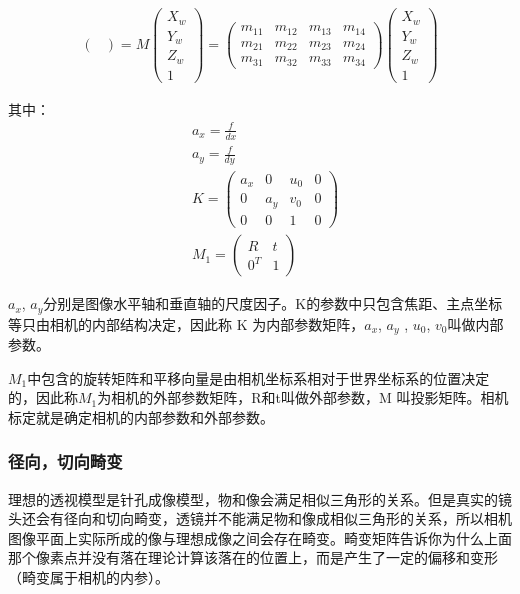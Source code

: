 \begin{align}
\begin{pmatrix}
\end{pmatrix} = M\begin{pmatrix}
X_w \\ Y_w \\ Z_w \\ 1\end{pmatrix}
= \begin{pmatrix}
m_{11} & m_{12} & m_{13} & m_{14}\\
m_{21} & m_{22} & m_{23} & m_{24}\\
m_{31} & m_{32} & m_{33} & m_{34}
\end{pmatrix}
\begin{pmatrix}
X_w \\ Y_w \\ Z_w \\ 1
\end{pmatrix}
\end{align}

其中：
\begin{align}
&a_x = \frac{f}{dx} \nonumber \\
&a_y = \frac{f}{dy} \nonumber \\
&K = \begin{pmatrix}
a_x & 0 & u_0 & 0 \\
0 & a_y & v_0 & 0 \\
0 & 0 & 1 & 0
\end{pmatrix} \nonumber \\
&M_1 = \begin{pmatrix}
R & t \\
0^T & 1
\end{pmatrix} \nonumber
\end{align}

$a_x$, $a_y$分别是图像水平轴和垂直轴的尺度因子。K的参数中只包含焦距、主点坐标等只由相机的内部结构决定，因此称 K 为内部参数矩阵，$a_x$, $a_y$ , $u_0$, $v_0$叫做内部参数。

$M_1$中包含的旋转矩阵和平移向量是由相机坐标系相对于世界坐标系的位置决定的，因此称$M_1$为相机的外部参数矩阵，R和t叫做外部参数，M 叫投影矩阵。相机标定就是确定相机的内部参数和外部参数。

\subsubsection{径向，切向畸变}

理想的透视模型是针孔成像模型，物和像会满足相似三角形的关系。但是真实的镜头还会有径向和切向畸变，透镜并不能满足物和像成相似三角形的关系，所以相机图像平面上实际所成的像与理想成像之间会存在畸变。畸变矩阵告诉你为什么上面那个像素点并没有落在理论计算该落在的位置上，而是产生了一定的偏移和变形（畸变属于相机的内参）。

